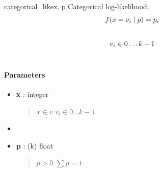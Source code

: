 \hypertarget{pymc.distributions.categorical_like}{}\begin{funcdesc}{categorical\_like}{x, p}
Categorical log-likelihood.
\begin{gather}
\begin{split}f(x=v_i \mid p) = p_i\end{split}\notag\\\begin{split}\end{split}\notag
\end{gather}\begin{gather}
\begin{split}v_i \in 0 \ldots k-1\end{split}\notag\\\begin{split}\end{split}\notag
\end{gather}
\paragraph{Parameters}
\begin{itemize}
\item[] \textbf{x} : integer
\begin{quote}

$x \in v$
$v_i \in 0 \ldots k-1$
\end{quote}

\item[] \item[] \textbf{p} : (k) float
\begin{quote}

$p > 0$
$\sum p = 1$
\end{quote}
\end{itemize}
\end{funcdesc}

